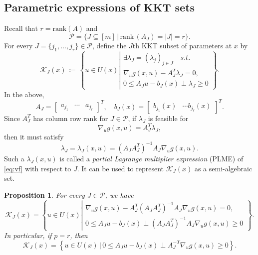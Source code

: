 \documentclass{amsart}
\theoremstyle{plain}
\newtheorem{prop}[theorem]{Proposition}
\newcommand{\st}{\mathit{s.t.}}
\newcommand{\mc}[1]{\mathcal{#1}}
\newcommand{\bbm}{\begin{bmatrix}}
\newcommand{\ebm}{\end{bmatrix}}
\numberwithin{equation}{section}
\begin{document}
	\subsection{Parametric expressions of KKT sets}
	Recall that $r = \mbox{rank}(A)$ and 
	\[
	\mc{P} = \{J\subseteq [m]\,\vert\, \mbox{rank}\, (A_J) = |J| = r\}.
	\]
	For every $J = \{j_1,\ldots, j_r\}\in\mc{P}$, 
    define the $J$th KKT subset of parameters at $x$ by
		\begin{equation}\label{eq:kkt_iJ}
			\mc{K}_{J}(x) \,\coloneqq\, \left\{ u\in U(x)\left|
			\begin{array}{l}
				\mbox{$\exists\lambda_{J} = (\lambda_j)_{j\in J}$}\quad\st\\
				\nabla_u g(x,u) - A_J^T\lambda_J = 0,\\
				0\le A_Ju-b_J(x)\perp \lambda_J\ge 0
			\end{array}\right.\right\}.
		\end{equation}
	In the above, 
	\[	A_J = \bbm a_{j_1} & \cdots & a_{j_r}\ebm^T,\quad
	b_J(x) = \bbm b_{j_1}(x) & \cdots b_{j_r}(x)\ebm^T.\]
	Since $A_J^T$ has column row rank for $J\in\mc{P}$, 
	if $\lambda_J$ is feasible for
	\begin{equation}\label{eq:KKTjeq}
		\nabla_u g(x,u) = A_J^T\lambda_J,
		\end{equation}
	then it must satisfy 
	\begin{equation}\label{eq:plme}
		\lambda_J = \lambda_J(x,u) =(A_JA_J^T)^{-1}A_J\nabla_u g(x,u). 
	\end{equation}
	Such a $\lambda_J(x,u)$ is called a \emph{partial Lagrange multiplier expression} (PLME) 
	of \eqref{eq:vf} with respect to $J$.
	It can be used to represent $\mc{K}_J(x)$ as a semi-algebraic set.
	\begin{prop}\label{prop:para}
		For every $J\in\mc{P}$, we have
		\begin{equation}\label{eq:Kjexp}
			\mc{K}_J(x) = \left\{ u\in U(x)\left|\begin{array}{c}
				\nabla_u g(x,u)-A_J^T(A_JA_J^T)^{-1}A_J\nabla_u g(x,u) = 0,\\
				0\le A_Ju-b_J(x)\perp (A_JA_J^T)^{-1}A_J\nabla_u g(x,u)\ge 0
			\end{array}\right.\right\}.
		\end{equation}
		In particular, if $p=r$, then
		\begin{equation}\label{eq:Kjsimple}
			\mc{K}_J(x) = \left\{u\in U(x)\,\vert\, 0\le A_Ju-b_J(x)\perp 
			A_J^{-T}\nabla_u g(x,u)\ge 0\right\}.
		\end{equation}
	\end{prop}
\end{document}
